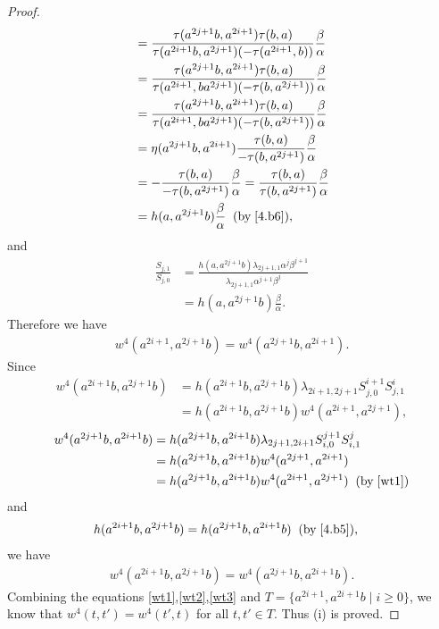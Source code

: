 \documentclass[a4paper,11pt]{amsart}
\numberwithin{equation}{section}
\begin{document}
\begin{proof}
\begin{align*}
&=\frac{\tau(a^{2j+1}b,a^{2i+1}) \tau(b,a)}{\tau(a^{2i+1}b,a^{2j+1}) (-\tau(a^{2i+1},b))} \frac{\beta}{\alpha}\\
&=\frac{\tau(a^{2j+1}b,a^{2i+1}) \tau(b,a)}{\tau(a^{2i+1},ba^{2j+1}) (-\tau(b,a^{2j+1}))} \frac{\beta}{\alpha}\\
&=\frac{\tau(a^{2j+1}b,a^{2i+1}) \tau(b,a)}{\tau(a^{2i+1},ba^{2j+1}) (-\tau(b,a^{2j+1}))} \frac{\beta}{\alpha}\\
&=\eta(a^{2j+1}b,a^{2i+1}) \frac{\tau(b,a)}{-\tau(b,a^{2j+1})} \frac{\beta}{\alpha}\\
&=- \frac{\tau(b,a)}{-\tau(b,a^{2j+1})} \frac{\beta}{\alpha}=\frac{\tau(b,a)}{\tau(b,a^{2j+1})} \frac{\beta}{\alpha}\\
&=h(a,a^{2j+1}b) \frac{\beta}{\alpha}\;\;(\text{by}\;\eqref{4.b6}),\\
\end{align*}
and
\begin{align*}
\frac{S_{j,1}}{S_{j,0}}&=\frac{h(a,a^{2j+1}b) \lambda_{2j+1,1} \alpha^j \beta^{j+1}}{\lambda_{2j+1,1} \alpha^{j+1} \beta^{j}}\\
&=h(a,a^{2j+1}b) \frac{\beta}{\alpha}.
\end{align*}
Therefore we have
\begin{align}
\label{wt2} w^4(a^{2i+1},a^{2j+1}b)=w^4(a^{2j+1}b,a^{2i+1}).
\end{align}
Since
\begin{align*}
w^4(a^{2i+1}b,a^{2j+1}b)&=h(a^{2i+1}b,a^{2j+1}b) \lambda_{2i+1,2j+1} S_{j,0}^{i+1} S_{j,1}^i\\
&=h(a^{2i+1}b,a^{2j+1}b) w^4(a^{2i+1},a^{2j+1}),
\end{align*}
\begin{align*}
w^4(a^{2j+1}b,a^{2i+1}b)&=h(a^{2j+1}b,a^{2i+1}b) \lambda_{2j+1,2i+1} S_{i,0}^{j+1} S_{i,1}^j\\
&=h(a^{2j+1}b,a^{2i+1}b) w^4(a^{2j+1},a^{2i+1})\\
&=h(a^{2j+1}b,a^{2i+1}b) w^4(a^{2i+1},a^{2j+1})\;\;(\text{by}\;\eqref{wt1})
\end{align*}
and
\begin{align*}
h(a^{2i+1}b,a^{2j+1}b)&=h(a^{2j+1}b,a^{2i+1}b)\;\;(\text{by}\;\eqref{4.b5}),
\end{align*}
we have
\begin{align}
\label{wt3} w^4(a^{2i+1}b,a^{2j+1}b)=w^4(a^{2j+1}b,a^{2i+1}b).
\end{align}
Combining the equations \eqref{wt1},\eqref{wt2},\eqref{wt3} and $T=\{a^{2i+1},a^{2i+1}b\;|\;i\geq 0\}$, we know that $w^4(t,t')=w^4(t',t)$ for all $t,t'\in T$. Thus (i) is proved.


\end{proof}
\end{document}
